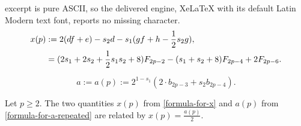 \documentclass[10pt,a4paper]{amsart}
\begin{document}
excerpt is pure ASCII, so the delivered engine, XeLaTeX with its default Latin Modern text font, reports no missing character.
\begin{align} 
\label{formula-for-x}
 \notag   x(p)&:= 2(df+e) - s_2d-s_1(gf+h-\frac{1}{2}s_2g),\\
    &= (2s_1+2s_2+\displaystyle\frac{1}{2}s_1s_2+8)F_{2p-2}-(s_1+s_2+8)F_{2p-4}+2F_{2p-6}.
\end{align}

\begin{equation}
\label{formula-for-a-repeated}
a:=a(p):=2^{1-s_1}(2\cdot b_{2p-3} +s_2b_{2p-4}).
\end{equation}

\begin{lemma}
\label{a-is-2x}
Let $p \geq 2.$ The two quantities $x(p)$ from \eqref{formula-for-x} and $a(p)$ from \eqref{formula-for-a-repeated} are related by
$x(p) = \displaystyle\frac{a(p)}{2}.$
\end{lemma} 
\end{document}
